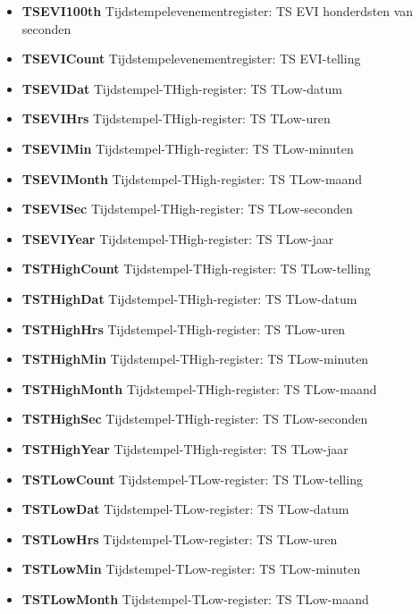 \begin{itemize}
\item{\bf{TSEVI100th}} Tijdstempelevenementregister: TS EVI honderdsten van seconden
\item{\bf{TSEVICount}} Tijdstempelevenementregister: TS EVI-telling
\item{\bf{TSEVIDat}} Tijdstempel-THigh-register: TS TLow-datum
\item{\bf{TSEVIHrs}} Tijdstempel-THigh-register: TS TLow-uren
\item{\bf{TSEVIMin}} Tijdstempel-THigh-register: TS TLow-minuten
\item{\bf{TSEVIMonth}} Tijdstempel-THigh-register: TS TLow-maand
\item{\bf{TSEVISec}} Tijdstempel-THigh-register: TS TLow-seconden
\item{\bf{TSEVIYear}} Tijdstempel-THigh-register: TS TLow-jaar
\item{\bf{TSTHighCount}} Tijdstempel-THigh-register: TS TLow-telling
\item{\bf{TSTHighDat}} Tijdstempel-THigh-register: TS TLow-datum
\item{\bf{TSTHighHrs}} Tijdstempel-THigh-register: TS TLow-uren
\item{\bf{TSTHighMin}} Tijdstempel-THigh-register: TS TLow-minuten
\item{\bf{TSTHighMonth}} Tijdstempel-THigh-register: TS TLow-maand
\item{\bf{TSTHighSec}} Tijdstempel-THigh-register: TS TLow-seconden
\item{\bf{TSTHighYear}} Tijdstempel-THigh-register: TS TLow-jaar
\item{\bf{TSTLowCount}} Tijdstempel-TLow-register: TS TLow-telling
\item{\bf{TSTLowDat}} Tijdstempel-TLow-register: TS TLow-datum
\item{\bf{TSTLowHrs}} Tijdstempel-TLow-register: TS TLow-uren
\item{\bf{TSTLowMin}} Tijdstempel-TLow-register: TS TLow-minuten
\item{\bf{TSTLowMonth}} Tijdstempel-TLow-register: TS TLow-maand

\end{itemize}
